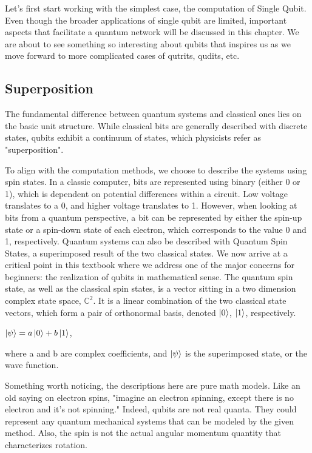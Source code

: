 \documentclass[12pt]{article}
\begin{document}
Let's first start working with the simplest case, the computation of Single Qubit. Even though the broader applications of single qubit are limited, important aspects that facilitate a quantum network will be discussed in this chapter. We are about to see something so interesting about qubits that inspires us as we move forward to more complicated cases of qutrits, qudits, etc.

\subsection{Superposition}

The fundamental difference between quantum systems and classical ones lies on the basic unit structure. While classical bits are generally described with discrete states, qubits exhibit a continuum of states, which physicists refer as "superposition".

To align with the computation methods, we choose to describe the systems using spin states. In a classic computer, bits are represented using binary (either 0 or 1), which is dependent on potential differences within a circuit. Low voltage translates to a 0, and higher voltage translates to 1. However, when looking at bits from a quantum perspective, a bit can be represented by either the spin-up state or a spin-down state of each electron, which corresponds to the value 0 and 1, respectively. Quantum systems can also be described with Quantum Spin States, a superimposed result of the two classical states. We now arrive at a critical point in this textbook where we address one of the major concerns for beginners: the realization of qubits in mathematical sense. The quantum spin state, as well as the classical spin states, is a vector sitting in a two dimension complex state space, $\mathbb{C}^2$. It is a linear combination of the two classical state vectors, which form a pair of orthonormal basis, denoted $\ket{0}$, $\ket{1}$, respectively.
\begin{center}
$\ket{\psi} = a\ket{0} + b\ket{1}$,
\end{center}
where a and b are complex coefficients, and $\ket{\psi}$ is the superimposed state, or the wave function.

Something worth noticing, the descriptions here are pure math models. Like an old saying on electron spins, "imagine an electron spinning, except there is no electron and it's not spinning." Indeed, qubits are not real quanta. They could represent any quantum mechanical systems that can be modeled by the given method. Also, the spin is not the actual angular momentum quantity that characterizes rotation.
\end{document}

